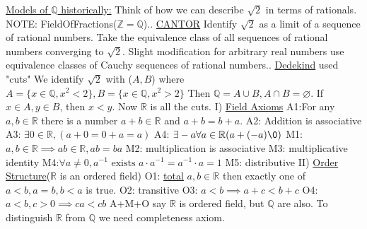 \documentclass[12pt]{article}
\newcommand{\Z}{\mathbb{Z}}
\newcommand{\Q}{\mathbb{Q}}
\newcommand{\R}{\mathbb{R}}
\begin{document}
\begin{solution}
    \underline{Models of $\Q$ historically:}\newline
    Think of how we can describe $\sqrt{2}$ in terms of rationals.\newline
    NOTE: FieldOfFractions($\Z=\Q$).. \underline{CANTOR}\newline
    Identify $\sqrt{2}$ as a limit of a sequence of rational numbers. Take the equivalence class of all sequences of rational numbers converging to $\sqrt{2}$. Slight modification for arbitrary real numbers use equivalence classes of Cauchy sequences of rational numbers.. \underline{Dedekind} used "cuts"\newline
    We identify $\sqrt{2}$ with ($A,B$) where $A=\{x\in\Q,x^2<2\},B=\{x\in\Q, x^2>2\}$\newline
    Then $\Q=A\cup B,A\cap B=\varnothing$.\newline
    If $x\in A,y\in B$, then $x<y$. Now $\R$ is all the cuts.\newline\newline
I) \underline{Field Axioms}\newline
A1:For any $a,b\in\R$ there is a number $a+b\in\R$ and $a+b=b+a$.\newline
A2: Addition is associative\newline
A3: $\exists 0\in\R, (a+0=0+a=a)$\newline
A4: $\exists-a\forall a\in\R(a+(-a)\0)$\newline
M1: $a,b\in\R\implies ab\in\R,ab=ba$\newline
M2: multiplication is associative\newline
M3: multiplicative identity\newline
M4:$\forall a\neq 0, a^{-1} \text{ exists } a\cdot a^{-1}=a^{-1}\cdot a=1$\newline
M5: distributive\newline
II) \underline{Order Structure}($\R$ is an ordered field)\newline
O1: \underline{total} $a,b\in\R$ then exactly one of $a<b,a=b,b<a$ is true.\newline
O2: transitive\newline
O3: $a<b\implies a+c<b+c$\newline
O4: $a<b,c>0\implies ca<cb$\newline
A+M+O say $\R$ is ordered field, but $\Q$ are also.\newline
To distinguish $\R$ from $\Q$ we need completeness axiom.
\end{solution}
\end{document}
